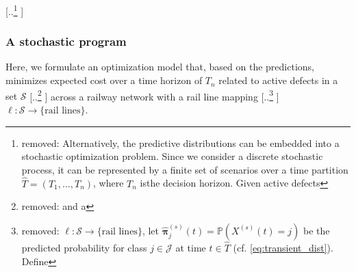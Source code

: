\documentclass{article}
\providecommand{\DIFadd}[1]{{\protect\color{blue} \sf #1}} %
\providecommand{\DIFdel}[1]{{\protect\color{red} [..\footnote{removed: #1} ]}} %
\providecommand{\DIFaddbegin}{} %
\providecommand{\DIFaddend}{} %
\providecommand{\DIFdelbegin}{} %
\providecommand{\DIFdelend}{} %
\begin{document}
\DIFdel{Alternatively, the predictive distributions can be embedded into a stochastic optimization problem.
Since we consider a discrete stochastic process, it can be represented by a finite set of scenarios over a time partition $\widehat{T}=(T_1,\dots,T_n)$, where $T_n$ isthe decision horizon.
Given active defects }\DIFdelend \DIFaddbegin \subsubsection{\DIFadd{A stochastic program}}
\DIFadd{Here, we formulate an optimization model that, based on the predictions, minimizes expected cost over a time horizon of $T_n$ related to active defects in a set }\DIFaddend $\mathcal{S}$ \DIFdelbegin \DIFdel{and a }\DIFdelend \DIFaddbegin \DIFadd{across a railway network with a }\DIFaddend rail line mapping \DIFdelbegin \DIFdel{$\ell:\mathcal{S}\to\{\text{rail lines}\}$, let $\widehat{\bm\pi}^{(s)}_j(t)=\mathds{P}(X^{(s)}(t)=j)$ be the predicted probability for class $j\in\mathcal{J}$ at time $t\in\widehat{T}$ (cf.
\cref{eq:transient_dist}). Define
}%
\DIFdelend \DIFaddbegin \DIFadd{$\ell:\mathcal{S}\to\{\text{rail lines}\}$.
}
\end{document}

